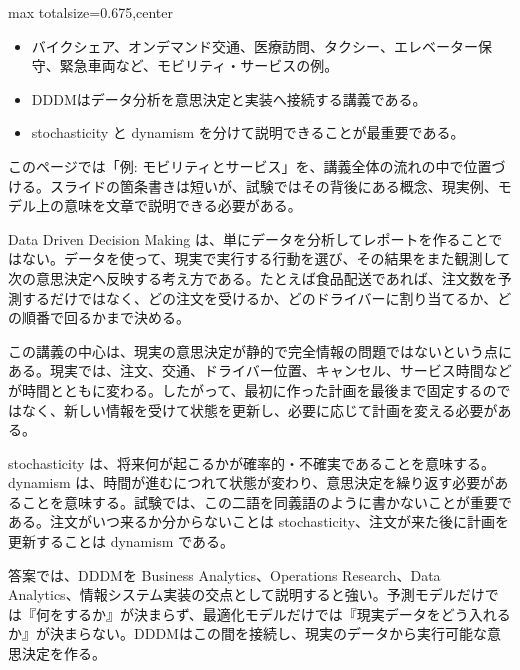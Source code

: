 \clearpage
{}
\begin{adjustbox}{max totalsize={\textwidth}{0.675\textheight},center}
\begin{minipage}{\textwidth}\scriptsize
\begin{minipage}[t]{0.485\textwidth}
\begin{itemize}
\item バイクシェア、オンデマンド交通、医療訪問、タクシー、エレベーター保守、緊急車両など、モビリティ・サービスの例。
\end{itemize}
\begin{itemize}
\item DDDMはデータ分析を意思決定と実装へ接続する講義である。
\item stochasticity と dynamism を分けて説明できることが最重要である。
\end{itemize}
\end{minipage}\hfill
\begin{minipage}[t]{0.485\textwidth}
このページでは「例: モビリティとサービス」を、講義全体の流れの中で位置づける。スライドの箇条書きは短いが、試験ではその背後にある概念、現実例、モデル上の意味を文章で説明できる必要がある。\par
Data Driven Decision Making は、単にデータを分析してレポートを作ることではない。データを使って、現実で実行する行動を選び、その結果をまた観測して次の意思決定へ反映する考え方である。たとえば食品配送であれば、注文数を予測するだけではなく、どの注文を受けるか、どのドライバーに割り当てるか、どの順番で回るかまで決める。\par
この講義の中心は、現実の意思決定が静的で完全情報の問題ではないという点にある。現実では、注文、交通、ドライバー位置、キャンセル、サービス時間などが時間とともに変わる。したがって、最初に作った計画を最後まで固定するのではなく、新しい情報を受けて状態を更新し、必要に応じて計画を変える必要がある。\par
stochasticity は、将来何が起こるかが確率的・不確実であることを意味する。dynamism は、時間が進むにつれて状態が変わり、意思決定を繰り返す必要があることを意味する。試験では、この二語を同義語のように書かないことが重要である。注文がいつ来るか分からないことは stochasticity、注文が来た後に計画を更新することは dynamism である。\par
答案では、DDDMを Business Analytics、Operations Research、Data Analytics、情報システム実装の交点として説明すると強い。予測モデルだけでは『何をするか』が決まらず、最適化モデルだけでは『現実データをどう入れるか』が決まらない。DDDMはこの間を接続し、現実のデータから実行可能な意思決定を作る。\par

\end{minipage}
\end{minipage}
\end{adjustbox}
